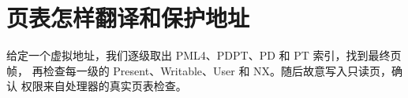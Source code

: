 \chapter{页表怎样翻译和保护地址}

给定一个虚拟地址，我们逐级取出 PML4、PDPT、PD 和 PT 索引，找到最终页帧，
再检查每一级的 Present、Writable、User 和 NX。随后故意写入只读页，确认
权限来自处理器的真实页表检查。




